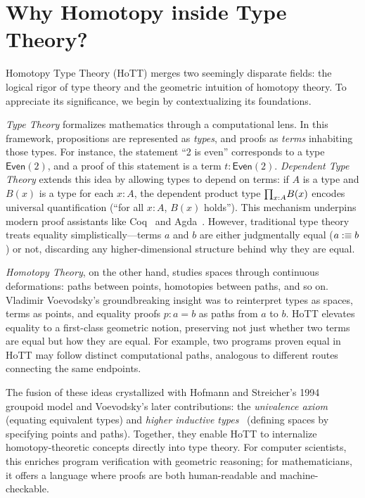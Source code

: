 \section{Why Homotopy inside Type Theory?}\label{sec:intro}

Homotopy Type Theory (HoTT) merges two seemingly disparate fields: the logical rigor of type theory and the geometric intuition of homotopy theory. To appreciate its significance, we begin by contextualizing its foundations.

\emph{Type Theory} formalizes mathematics through a computational lens. In this framework, propositions are represented as \emph{types}, and proofs as \emph{terms} inhabiting those types. For instance, the statement ``2 is even'' corresponds to a type \(\textsf{Even}(2)\), and a proof of this statement is a term \(t : \textsf{Even}(2)\). 
\emph{Dependent Type Theory} extends this idea by allowing types to depend on terms: if \(A\) is a type and \(B(x)\) is a type for each \(x : A\), the dependent product type \(\textstyle\mathbf{\prod}_{x:A} B(x)\) encodes universal quantification (``for all \(x : A\), \(B(x)\) holds''). 
This mechanism underpins modern proof assistants like Coq~\cite{bauer2016hottlibraryformalizationhomotopy} and Agda~\cite{Agda}. 
However, traditional type theory treats equality simplistically—terms \(a\) and \(b\) are either judgmentally equal (\(a :\equiv b\)) or not, discarding any higher-dimensional structure behind why they are equal.

\emph{Homotopy Theory}, on the other hand, studies spaces through continuous deformations: paths between points, homotopies between paths, and so on. Vladimir Voevodsky’s groundbreaking insight was to reinterpret types as spaces, terms as points, and equality proofs \(p : a = b\) as paths from \(a\) to \(b\).
HoTT elevates equality to a first-class geometric notion, preserving not just whether two terms are equal but how they are equal.
For example, two programs proven equal in HoTT may follow distinct computational paths, analogous to different routes connecting the same endpoints.

The fusion of these ideas crystallized with Hofmann and Streicher’s 1994 groupoid model and Voevodsky’s later contributions: the \emph{univalence axiom} (equating equivalent types) and \emph{higher inductive types}~\cite{hottbook} (defining spaces by specifying points and paths). Together, they enable HoTT to internalize homotopy-theoretic concepts directly into type theory. For computer scientists, this enriches program verification with geometric reasoning; for mathematicians, it offers a language where proofs are both human-readable and machine-checkable.